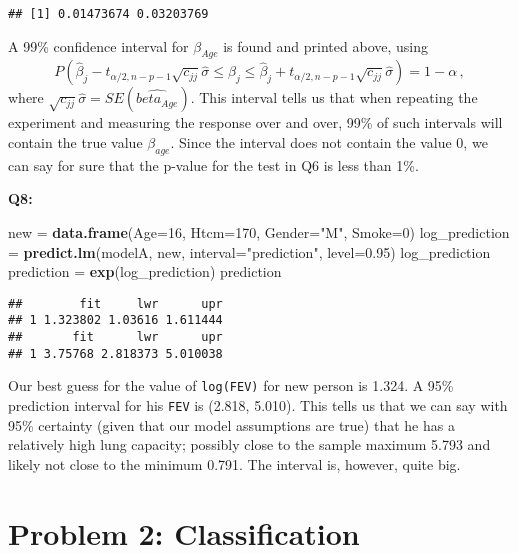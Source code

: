 \documentclass[]{article}
\newenvironment{Shaded}{\begin{snugshade}}{\end{snugshade}}
\newcommand{\KeywordTok}[1]{\textcolor[rgb]{0.13,0.29,0.53}{\textbf{#1}}}
\newcommand{\DataTypeTok}[1]{\textcolor[rgb]{0.13,0.29,0.53}{#1}}
\newcommand{\DecValTok}[1]{\textcolor[rgb]{0.00,0.00,0.81}{#1}}
\newcommand{\FloatTok}[1]{\textcolor[rgb]{0.00,0.00,0.81}{#1}}
\newcommand{\StringTok}[1]{\textcolor[rgb]{0.31,0.60,0.02}{#1}}
\newcommand{\NormalTok}[1]{#1}
\begin{document}
\begin{verbatim}
## [1] 0.01473674 0.03203769
\end{verbatim}

A 99\% confidence interval for \(\beta_{Age}\) is found and printed
above, using
\[ P(\hat{\beta}_j-t_{\alpha/2,n-p-1}\sqrt{c_{jj}}\hat{\sigma}
\le \beta_j \le \hat{\beta}_j+t_{\alpha/2,n-p-1}\sqrt{c_{jj}}\hat{\sigma})=
1-\alpha \, ,\] where
\(\sqrt{c_{jj}}\hat{\sigma} = SE(\hat{beta_{Age}})\). This interval
tells us that when repeating the experiment and measuring the response
over and over, 99\% of such intervals will contain the true value
\(\beta_{age}\). Since the interval does not contain the value 0, we can
say for sure that the p-value for the test in Q6 is less than 1\%.

\textbf{Q8:}

\begin{Shaded}
\begin{Highlighting}[]
\NormalTok{new =}\StringTok{ }\KeywordTok{data.frame}\NormalTok{(}\DataTypeTok{Age=}\DecValTok{16}\NormalTok{, }\DataTypeTok{Htcm=}\DecValTok{170}\NormalTok{, }\DataTypeTok{Gender=}\StringTok{"M"}\NormalTok{, }\DataTypeTok{Smoke=}\DecValTok{0}\NormalTok{)}
\NormalTok{log_prediction =}\StringTok{ }\KeywordTok{predict.lm}\NormalTok{(modelA, new, }\DataTypeTok{interval=}\StringTok{"prediction"}\NormalTok{, }\DataTypeTok{level=}\FloatTok{0.95}\NormalTok{)}
\NormalTok{log_prediction}
\NormalTok{prediction =}\StringTok{ }\KeywordTok{exp}\NormalTok{(log_prediction)}
\NormalTok{prediction}
\end{Highlighting}
\end{Shaded}

\begin{verbatim}
##        fit     lwr      upr
## 1 1.323802 1.03616 1.611444
##       fit      lwr      upr
## 1 3.75768 2.818373 5.010038
\end{verbatim}

Our best guess for the value of \texttt{log(FEV)} for new person is
1.324. A 95\% prediction interval for his \texttt{FEV} is (2.818,
5.010). This tells us that we can say with 95\% certainty (given that
our model assumptions are true) that he has a relatively high lung
capacity; possibly close to the sample maximum 5.793 and likely not
close to the minimum 0.791. The interval is, however, quite big.

\section{Problem 2: Classification}\label{problem-2-classification}
\end{document}
